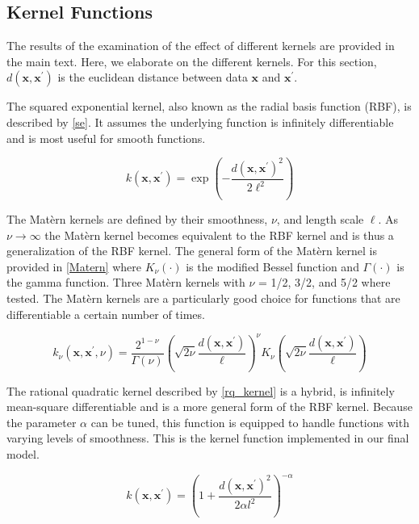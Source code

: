 \documentclass[journal=jacsat,manuscript=article]{achemso}
\begin{document}
\subsection{Kernel Functions}

The results of the examination of the effect of different kernels are provided in the main text. Here, we elaborate on the different kernels. For this section, $d(\mathbf{x}, \mathbf{x}^{\prime})$ is the euclidean distance between data $\mathbf{x}$ and $\mathbf{x}^{\prime}$.

The squared exponential kernel, also known as the radial basis function (RBF), is described by \eqref{se}. It assumes the underlying function is infinitely differentiable and is most useful for smooth functions.

\begin{equation}
    k(\mathbf{x}, \mathbf{x}^{\prime}) = \exp\left(-\frac{d(\mathbf{x}, \mathbf{x}^{\prime})^2}{2\ell^2} \right)
    \label{se}
\end{equation}

The Mat\`ern kernels are defined by their smoothness, $\nu$, and length scale $\ell$. As $\nu \rightarrow \infty$ the Mat\`ern kernel becomes equivalent to the RBF kernel and is thus a generalization of the RBF kernel. The general form of the Mat\`ern kernel is provided in \eqref{Matern} where $K_\nu(\cdot)$ is the modified Bessel function and $\Gamma(\cdot)$ is the gamma function. Three Mat\`ern kernels with $\nu$ = 1/2, 3/2, and 5/2 where tested. The Mat\`ern kernels are a particularly good choice for functions that are differentiable a certain number of times.

\begin{equation}
    k_\nu(\mathbf{x}, \mathbf{x}^{\prime}, \nu) = \frac{2^{1-\nu}}{\Gamma(\nu)} \left( \sqrt{2\nu} \frac{d(\mathbf{x}, \mathbf{x}^{\prime})}{\ell} \right)^\nu K_\nu \left( \sqrt{2\nu} \frac{d(\mathbf{x}, \mathbf{x}^{\prime})}{\ell} \right)
    \label{Matern}
\end{equation}

The rational quadratic kernel described by \eqref{rq_kernel} is a hybrid, is infinitely mean-square differentiable \cite{Gramacy2020Surrogates:Sciences} and is a more general form of the RBF kernel. Because the parameter $\alpha$ can be tuned, this function is equipped to handle functions with varying levels of smoothness. This is the kernel function implemented in our final model.

\begin{equation}
    k(\mathbf{x}, \mathbf{x}^{\prime}) = \left(1 + \frac{d(\mathbf{x}, \mathbf{x}^{\prime})^2}{2\alpha l^2}\right)^{-\alpha}
    \label{rq_kernel}
\end{equation}
\end{document}
